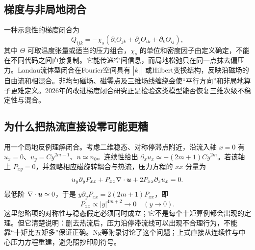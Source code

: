 \subsection{梯度与非局地闭合}
一种示意性的梯度闭合为
\begin{equation}Q_{ijk}=-\chi_s\left(\partial_i\Theta_{jk}+\partial_j\Theta_{ik}+\partial_k\Theta_{ij}\right),
\end{equation}
其中 $\Theta$ 可取温度张量或适当的压力组合，$\chi_s$ 的单位和密度因子由定义确定，不能在不同代码之间直接复制。它能传递空间信息，而局地松弛只在同一点抹去偏压力。Landau流体型闭合在Fourier空间具有 $|k_\parallel|$ 或Hilbert变换结构，反映沿磁场的自由流和相混合。非均匀磁场、磁零点及三维场线缠绕会使“平行方向”和非局地算子更难定义。2026年的改进梯度闭合研究正是检验这类模型能否恢复三维次级不稳定性与混合。\citep{Closure2026}

\subsection{为什么把热流直接设零可能更糟}
用一个局地反例理解闭合。考虑二维稳态、对称停滞点附近，沿流入轴 $x=0$ 有 $u_x=0$、$u_y=C y^{2m+1}$、$n\simeq n_0$。连续性给出
$\partial_xu_x\simeq-(2m+1)Cy^{2m}$。若该轴上 $P_{xy}=0$，并忽略相应磁旋转耦合与热流，压力方程的 $xx$ 分量为
\begin{equation}
u_y\partial_yP_{xx}+P_{xx}\nabla\cdot\bm{u}+2P_{xx}\partial_xu_x=0.
\end{equation}
最低阶 $\nabla\cdot\bm{u}\simeq0$，于是
$y\partial_yP_{xx}=2(2m+1)P_{xx}$，即
\begin{equation}P_{xx}\propto |y|^{4m+2}\longrightarrow0\quad(y\to0).
\end{equation}
这里忽略项的对称性与稳态假定必须同时成立；它不是每个十矩算例都会出现的定理。但它清楚说明：删去热流后，压力沿停滞流线可以出现不合理行为，不能靠“十矩比五矩多”保证正确。Ng等附录讨论了这个问题；上式直接从连续性与中心压力方程重建，避免照抄印刷符号。\citep{Ng2020}

